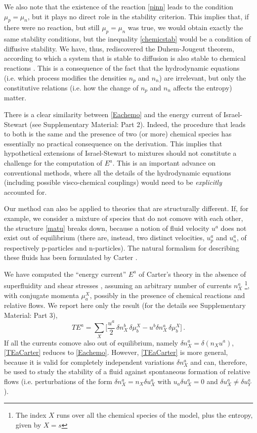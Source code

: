 \documentclass[a4paper, amsfonts, amssymb, amsmath, reprint, showkeys, nofootinbib, twoside, onecolumn,notitlepage]{revtex4-1}
\begin{document}
We also note that the existence of the reaction \eqref{pinn} leads to the condition $\mu_p=\mu_n$, but it plays no direct role in the stability criterion. This implies that, if there were no reaction, but still $\mu_p=\mu_n$ was true, we would obtain exactly the same stability conditions, but the inequality \eqref{chemicstab} would be a condition of diffusive stability. We have, thus, rediscovered the Duhem-Jougeut theorem, according to which a system that is stable to diffusion is also stable to chemical reactions \cite{PrigoginebookModernThermodynamics2014}. This is a consequence of the fact that the hydrodynamic equations (i.e. which process modifies the densities $n_p$ and $n_n$) are irrelevant, but only the constitutive relations (i.e. how the change of $n_p$ and $n_n$ affects the entropy) matter.

There is a clear similarity between \eqref{Eachemo} and the energy current of Israel-Stewart (see Supplementary Material: Part 2). Indeed, the procedure that leads to both is the same and the presence of two (or more) chemical species has essentially no practical consequence on the derivation. This implies that hypothetical extensions of Israel-Stewart to mixtures should not constitute a challenge for the computation of $E^a$. This is an important advance on conventional methods, where all the details of the hydrodynamic equations (including possible visco-chemical couplings) would need to be \textit{explicitly} accounted for.

Our method can also be applied to theories that are structurally different. If, for example, we consider a mixture of species that do not comove with each other, the structure \eqref{matu} breaks down, because a notion of fluid velocity $u^a$ does not exist out of equilibrium (there are, instead, two distinct velocities, $u_p^a$ and $u_n^a$, of respectively p-particles and n-particles). The natural formalism for describing these fluids has been formulated by Carter \cite{carter1991}. 

We have computed the ``energy current'' $E^a$ of Carter's theory in the absence of superfluidity and shear stresses \cite{Carter_starting_point}, assuming an arbitrary number of currents $n_X^a$ \footnote{The index $X$ runs over all the chemical species of the model, plus the entropy, given by $X=s$}, with conjugate momenta $\mu^X_a$, possibly in the presence of chemical reactions and relative flows. We report here only the result (for the details see Supplementary Material: Part 3),
\begin{equation}\label{TEaCarter}
TE^a = \sum_{X} \bigg[ \dfrac{u^a}{2}  \, \delta n_X^b \, \delta \mu^X_b - u^b \delta n_X^a \, \delta \mu^X_b  \bigg] \, .
\end{equation}
If all the currents comove also out of equilibrium, namely $\delta n_X^a =\delta (n_X u^a)$, \eqref{TEaCarter} reduces to \eqref{Eachemo}. However, \eqref{TEaCarter} is more general, because it is valid for completely independent variations $\delta n_X^a$ and can, therefore, be used to study the stability of a fluid against spontaneous formation of relative flows (i.e. perturbations of the form $\delta n_X^a = n_X \delta u_X^a$ with $u_a \delta u_X^a=0$ and $\delta u_X^a \neq \delta u_Y^a$).
\end{document}
